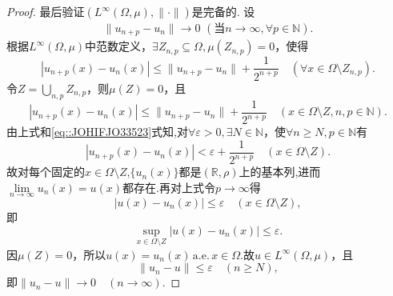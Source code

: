 \documentclass[../../main.tex]{subfiles}%
\begin{document}
\begin{proof}
最后验证$(L^\infty(\Omega,\mu),\|\cdot\|)$是完备的.
设
\begin{align}\label{eq::JOHIFJO33523}
\parallel u_{n+p}-u_n\parallel \rightarrow 0\,\,\left( \text{当}n\rightarrow \infty ,\forall p\in \mathbb{N} \right) .
\end{align}
根据$L^\infty(\Omega,\mu)$中范数定义，$\exists Z_{n,p} \subseteq \Omega, \mu(Z_{n,p}) = 0$，使得
$$|u_{n+p}(x)-u_n(x)| \leqslant \|u_{n+p}-u_n\| + \frac{1}{2^{n+p}} \quad (\forall x \in \Omega \setminus Z_{n,p}).$$
令$Z = \bigcup\limits_{n,p} Z_{n,p}$，则$\mu(Z)=0$，且
$$|u_{n+p}(x)-u_n(x)| \leqslant \|u_{n+p}-u_n\| + \frac{1}{2^{n+p}} \quad (x \in \Omega \setminus Z, n,p \in \mathbb{N}).$$
由上式和\eqref{eq::JOHIFJO33523}式知,对$\forall \varepsilon > 0, \exists N \in \mathbb{N}$，使$\forall n \geqslant N, p \in \mathbb{N}$有
$$|u_{n+p}(x)-u_n(x)| < \varepsilon + \frac{1}{2^{n+p}} \quad (x \in \Omega \setminus Z).$$
故对每个固定的$x \in \Omega \setminus Z$,$\{u_n(x)\}$都是$(\mathbb{R},\rho)$上的基本列,进而$\lim\limits_{n\to\infty} u_n(x) = u(x)$都存在.再对上式令$p \to \infty$得
$$|u(x)-u_n(x)| \leqslant \varepsilon \quad (x \in \Omega \setminus Z),$$
即
$$\sup\limits_{x \in \Omega \setminus Z} |u(x)-u_n(x)| \leqslant \varepsilon.$$
因$\mu(Z)=0$，所以$u(x)=u_n(x)\,\text{a.e.}\,x\in \Omega$.故$u \in L^\infty(\Omega,\mu)$，且
$$\|u_n - u\| \leqslant \varepsilon \quad (n \geqslant N),$$
即$\|u_n - u\| \to 0 \quad (n \to \infty).$

\end{proof}
\end{document}
